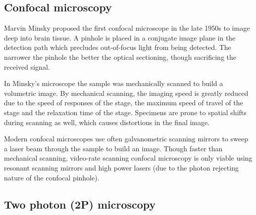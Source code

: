 \subsection{Confocal microscopy}

Marvin Minsky proposed the first \gls{confocal microscope} in the late 1950s to image deep into brain tissue.
A pinhole is placed in a conjugate image plane in the detection path which precludes out-of-focus light from being detected.
The narrower the pinhole the better the optical sectioning, though sacrificing the received signal.

In Minsky's microscope the sample was mechanically scanned to build a volumetric image.
By mechanical scanning, the imaging speed is greatly reduced due to the speed of responses of the stage, the maximum speed of travel of the stage and the relaxation time of the stage.
Specimens are prone to spatial shifts during scanning as well, which causes distortions in the final image.

Modern \gls{confocal microscope}s use often \gls{galvanometric scanning mirrors} to sweep a laser beam through the sample to build an image.
Though faster than mechanical scanning, video-rate scanning confocal microscopy is only viable using \gls{resonant scanning mirrors} and high power lasers (due to the photon rejecting nature of the confocal pinhole).

%

\subsection{Two photon (2P) microscopy}\label{sec:2p}


